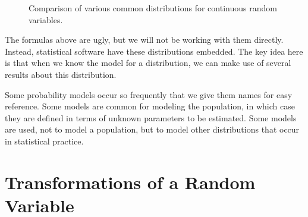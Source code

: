 \documentclass[
  letterpaper,
  DIV=11,
  numbers=noendperiod]{scrreprt}
\theoremstyle{definition}
\theoremstyle{plain}
\theoremstyle{definition}
\theoremstyle{remark}
\begin{document}
\begin{figure}


\caption{\label{fig-randomvariables-comparisons}Comparison of various
common distributions for continuous random variables.}

\end{figure}%

The formulas above are ugly, but we will not be working with them
directly. Instead, statistical software have these distributions
embedded. The key idea here is that when we know the model for a
distribution, we can make use of several results about this
distribution.

\begin{tcolorbox}[enhanced jigsaw, breakable, colframe=quarto-callout-tip-color-frame, titlerule=0mm, arc=.35mm, coltitle=black, opacitybacktitle=0.6, leftrule=.75mm, opacityback=0, left=2mm, toprule=.15mm, colbacktitle=quarto-callout-tip-color!10!white, title=\textcolor{quarto-callout-tip-color}{\faLightbulb}\hspace{0.5em}{Big Idea}, bottomtitle=1mm, toptitle=1mm, rightrule=.15mm, bottomrule=.15mm, colback=white]

Some probability models occur so frequently that we give them names for
easy reference. Some models are common for modeling the population, in
which case they are defined in terms of unknown parameters to be
estimated. Some models are used, not to model a population, but to model
other distributions that occur in statistical practice.

\end{tcolorbox}

\section{Transformations of a Random
Variable}\label{transformations-of-a-random-variable}
\end{document}

